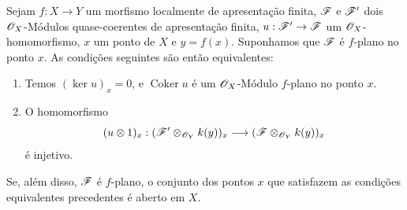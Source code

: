 \begin{proposition}[11.3.7]
\label{IV.11.3.7}
Sejam $f:X\to Y$ um morfismo localmente de apresentação finita,
$\mathscr{F}$ e $\mathscr{F}'$ dois $\mathscr{O}_X$-Módulos quase-coerentes
de apresentação finita, $u:\sh{F}'\to\sh{F}$ um
$\mathscr{O}_X$-homomorfismo, $x$ um ponto de $X$ e $y=f(x)$.
Suponhamos que $\mathscr{F}$ é $f$-plano no ponto $x$.
As condições seguintes são então equivalentes:
\begin{enumerate}[label=\emph{\alph*)}]
\item Temos $(\ker u)_x=0$, e $\operatorname{Coker}u$ é um
$\mathscr{O}_X$-Módulo $f$-plano no ponto $x$.
\item O homomorfismo
\[
(u\otimes1)_x:
(\mathscr{F}'\otimes_{\mathscr{O}_Y}k(y))_x
\longrightarrow
(\mathscr{F}\otimes_{\mathscr{O}_Y}k(y))_x
\]
é injetivo.
\end{enumerate}
Se, além disso, $\mathscr{F}$ é $f$-plano, o conjunto dos pontos
$x$ que satisfazem as condições equivalentes precedentes é
aberto em $X$.
\end{proposition}

